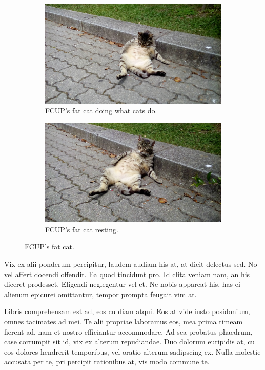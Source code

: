 \begin{figure}
	\centering
	\begin{subfigure}{.49\textwidth}
  		\centering
  		\includegraphics[width=.95\linewidth]{Figures/ChapterTemplate/20160517_123603.jpg}
  		\caption{FCUP's fat cat doing what cats do.}
	\end{subfigure}%
	\hfill
	\begin{subfigure}{.49\textwidth}
  		\centering
 		 \includegraphics[width=.95\linewidth]{Figures/ChapterTemplate/20160517_123609.jpg}
 		 \caption{FCUP's fat cat resting.}
	\end{subfigure}
	\caption{\label{fig:FCUPfatCat}FCUP's fat cat.} 
\end{figure}

Vix ex alii ponderum percipitur, laudem audiam his at, at dicit delectus sed. No vel affert docendi offendit. Ea quod tincidunt pro. Id clita veniam nam, an his diceret prodesset. Eligendi neglegentur vel et. Ne nobis appareat his, has ei alienum epicurei omittantur, tempor prompta feugait vim at.

Libris comprehensam est ad, eos cu diam atqui. Eos at vide iusto posidonium, omnes tacimates ad mei. Te alii propriae laboramus eos, mea prima timeam fierent ad, nam et nostro efficiantur accommodare. Ad sea probatus phaedrum, case corrumpit sit id, vix ex alterum repudiandae. Duo dolorum euripidis at, cu eos dolores hendrerit temporibus, vel oratio alterum sadipscing ex. Nulla molestie accusata per te, pri percipit rationibus at, vis modo commune te.

